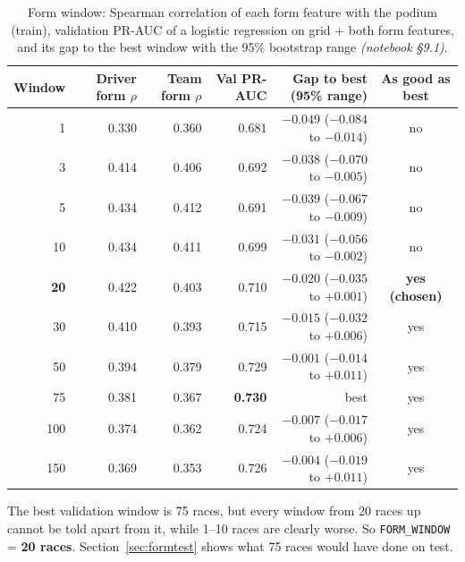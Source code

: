 \documentclass[11pt,a4paper]{article}
\newcommand{\code}[1]{\texttt{#1}}
\newcommand{\nb}[1]{\textit{(notebook \S#1)}}
\begin{document}
\begin{table}[H]
\centering\footnotesize
\caption{Form window: Spearman correlation of each form feature with the podium (train), validation PR-AUC of a logistic regression on grid + both form features, and its gap to the best window with the 95\% bootstrap range \nb{9.1}.}
\label{tab:window}
\begin{tabular}{rrrrrc}
\toprule
Window & Driver form $\rho$ & Team form $\rho$ & Val PR-AUC & Gap to best (95\% range) & As good as best \\
\midrule
1 & 0.330 & 0.360 & 0.681 & $-0.049$ ($-0.084$ to $-0.014$) & no \\
3 & 0.414 & 0.406 & 0.692 & $-0.038$ ($-0.070$ to $-0.005$) & no \\
5 & 0.434 & 0.412 & 0.691 & $-0.039$ ($-0.067$ to $-0.009$) & no \\
10 & 0.434 & 0.411 & 0.699 & $-0.031$ ($-0.056$ to $-0.002$) & no \\
\textbf{20} & 0.422 & 0.403 & 0.710 & $-0.020$ ($-0.035$ to $+0.001$) & \textbf{yes (chosen)} \\
30 & 0.410 & 0.393 & 0.715 & $-0.015$ ($-0.032$ to $+0.006$) & yes \\
50 & 0.394 & 0.379 & 0.729 & $-0.001$ ($-0.014$ to $+0.011$) & yes \\
75 & 0.381 & 0.367 & \textbf{0.730} & best & yes \\
100 & 0.374 & 0.362 & 0.724 & $-0.007$ ($-0.017$ to $+0.006$) & yes \\
150 & 0.369 & 0.353 & 0.726 & $-0.004$ ($-0.019$ to $+0.011$) & yes \\
\bottomrule
\end{tabular}
\end{table}

The best validation window is 75 races, but every window from 20 races up cannot be told apart from it, while 1--10 races are clearly worse. So \code{FORM\_WINDOW} = \textbf{20 races}. Section~\ref{sec:formtest} shows what 75 races would have done on test.
\end{document}
